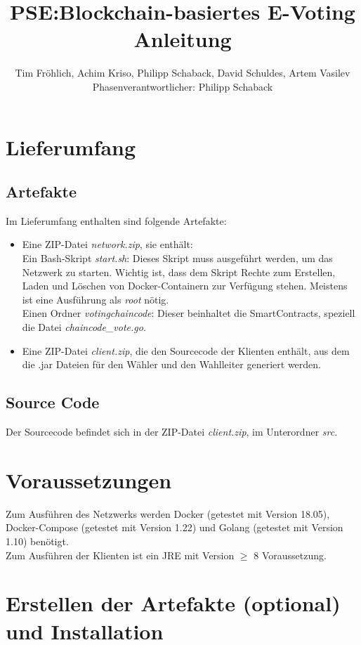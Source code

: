 \documentclass[parskip=full]{scrartcl}
\title{
	PSE:Blockchain-basiertes E-Voting \\
	Anleitung
}
\author{Tim Fröhlich, Achim Kriso, Philipp Schaback, David Schuldes, Artem Vasilev\\ Phasenverantwortlicher: Philipp Schaback}
\begin{document}
	\clearpage
	\maketitle
	\newpage
	
	\tableofcontents
	\newpage
	
	\section{Lieferumfang}
	\subsection{Artefakte}
	Im Lieferumfang enthalten sind folgende Artefakte:
	\begin{itemize}
		\item Eine ZIP-Datei \textit{network.zip}, sie enthält:\\
		Ein Bash-Skript \textit{start.sh}: Dieses Skript muss ausgeführt werden, um das Netzwerk zu starten. Wichtig ist, dass dem Skript Rechte zum Erstellen, Laden und Löschen von Docker-Containern zur Verfügung stehen. Meistens ist eine Ausführung als \textit{root} nötig.\\
		Einen Ordner \textit{votingchaincode}: Dieser beinhaltet die SmartContracts, speziell die Datei \textit{chaincode\_vote.go}.
		\item Eine ZIP-Datei \textit{client.zip}, die den Sourcecode der Klienten enthält, aus dem die .jar Dateien für den Wähler und den Wahlleiter generiert werden.
	\end{itemize}

	\subsection{Source Code}
	Der Sourcecode befindet sich in der ZIP-Datei \textit{client.zip}, im Unterordner \textit{src}.
	
	\section{Voraussetzungen}
	Zum Ausführen des Netzwerks werden Docker (getestet mit Version 18.05), Docker-Compose (getestet mit Version 1.22) und Golang (getestet mit Version 1.10) benötigt.\\
	Zum Ausführen der Klienten ist ein JRE mit Version $\ge$ 8 Voraussetzung.
	\section{Erstellen der Artefakte (optional) und Installation}
\end{document}
